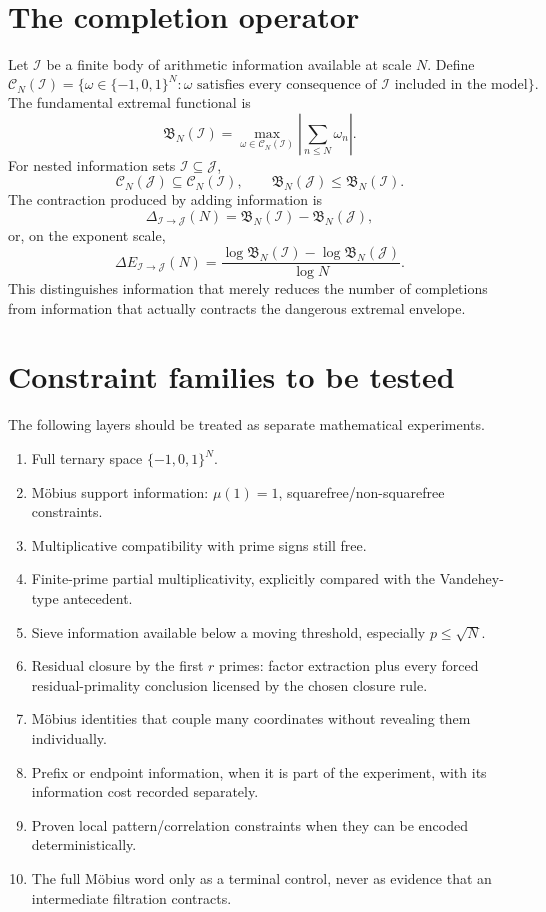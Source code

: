 \documentclass[11pt]{article}
\begin{document}
\section{The completion operator}
Let $\mathcal I$ be a finite body of arithmetic information available at scale $N$.  Define
\[
 \mathcal C_N(\mathcal I)
 =\{\omega\in\{-1,0,1\}^N:\omega\text{ satisfies every consequence of }\mathcal I\text{ included in the model}\}.
\]
The fundamental extremal functional is
\[
 \mathfrak B_N(\mathcal I)
 =\max_{\omega\in\mathcal C_N(\mathcal I)}
 \left|\sum_{n\le N}\omega_n\right|.
\]
For nested information sets $\mathcal I\subseteq\mathcal J$,
\[
 \mathcal C_N(\mathcal J)\subseteq\mathcal C_N(\mathcal I),
 \qquad
 \mathfrak B_N(\mathcal J)\le \mathfrak B_N(\mathcal I).
\]
The contraction produced by adding information is
\[
 \Delta_{\mathcal I\to\mathcal J}(N)
 =\mathfrak B_N(\mathcal I)-\mathfrak B_N(\mathcal J),
\]
or, on the exponent scale,
\[
 \Delta E_{\mathcal I\to\mathcal J}(N)
 =\frac{\log \mathfrak B_N(\mathcal I)-\log \mathfrak B_N(\mathcal J)}{\log N}.
\]
This distinguishes information that merely reduces the number of completions from information that actually contracts the dangerous extremal envelope.

\section{Constraint families to be tested}
The following layers should be treated as separate mathematical experiments.
\begin{enumerate}
\item Full ternary space $\{-1,0,1\}^N$.
\item Möbius support information: $\mu(1)=1$, squarefree/non-squarefree constraints.
\item Multiplicative compatibility with prime signs still free.
\item Finite-prime partial multiplicativity, explicitly compared with the Vandehey-type antecedent.
\item Sieve information available below a moving threshold, especially $p\le\sqrt N$.
\item Residual closure by the first $r$ primes: factor extraction plus every forced residual-primality conclusion licensed by the chosen closure rule.
\item Möbius identities that couple many coordinates without revealing them individually.
\item Prefix or endpoint information, when it is part of the experiment, with its information cost recorded separately.
\item Proven local pattern/correlation constraints when they can be encoded deterministically.
\item The full Möbius word only as a terminal control, never as evidence that an intermediate filtration contracts.
\end{enumerate}
\end{document}
